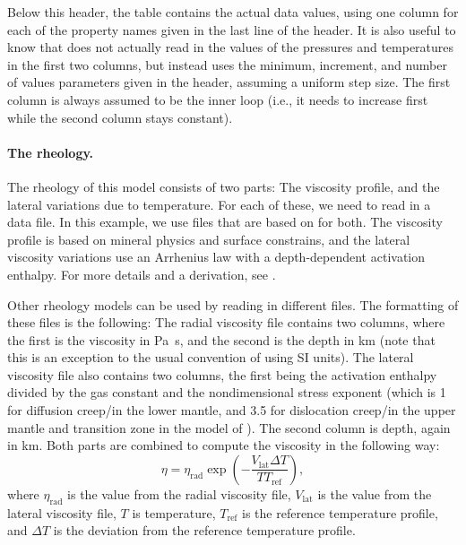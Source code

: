Below this header, the table contains the actual data values, using one column for each of the property names given in the last line of the header. 
It is also useful to know that \aspect{} does not actually read in the values of the pressures and temperatures in the first two columns, but instead uses the minimum, increment, and number of values parameters given in the header, assuming a uniform step size. The first column is always assumed to be the inner loop (i.e., it needs to increase first while the second column stays constant). 




\paragraph{The rheology.}
The rheology of this model consists of two parts: The viscosity profile, and the lateral variations due to temperature. For each of these, we need to read in a data file. In this example, we use files that are based on \cite{stca06} for both. The viscosity profile is based on mineral physics and surface constrains, and the lateral viscosity variations use an Arrhenius law with a depth-dependent activation enthalpy. For more details and a derivation, see \cite{stca06}. 

Other rheology models can be used by reading in different files. The formatting of these files is the following: The radial viscosity file contains two columns, where the first is the viscosity in \si{\pascal\second}, and the second is the depth in \si{\km} (note that this is an exception to the usual \aspect{} convention of using SI units). The lateral viscosity file also contains two columns, the first being the activation enthalpy divided by the gas constant and the nondimensional stress exponent (which is 1 for diffusion creep/in the lower mantle, and 3.5 for dislocation creep/in the upper mantle and transition zone in the model of \cite{stca06}). The second column is depth, again in \si{\km}. 
Both parts are combined to compute the viscosity in the following way:
\begin{equation}
  \eta = \eta_\text{rad} \exp{ \left( -\frac{V_\text{lat} \Delta T}{T T_\text{ref}} \right)} , 
\end{equation}
where $\eta_\text{rad}$ is the value from the radial viscosity file, 
$V_\text{lat}$ is the value from the lateral viscosity file, 
$T$ is temperature, $T_\text{ref}$ is the reference temperature profile, 
and $\Delta T$ is the deviation from the reference temperature profile. 

